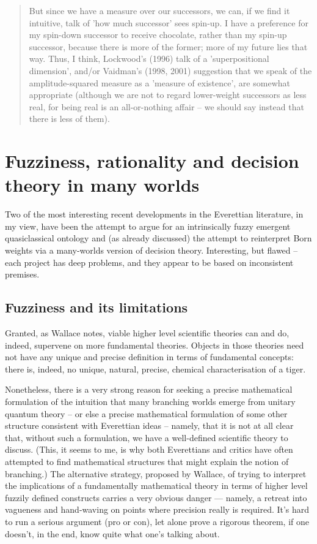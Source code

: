 \documentclass[aps,
pra,epsfig]{revtex4}
\begin{document}
\begin{quotation} 
But since we have
a measure over our successors, we can, if we find it intuitive, talk of 'how
much successor' sees spin-up. I have a preference for my spin-down successor
to receive chocolate, rather than my spin-up successor, because there is more of
the former; more of my future lies that way. Thus, I think, Lockwood's (1996)
talk of a 'superpositional dimension', and/or Vaidman's (1998, 2001) suggestion
that we speak of the amplitude-squared measure as a 'measure of existence', are
somewhat appropriate (although we are not to regard lower-weight successors
as less real, for being real is an 
all-or-nothing affair -- we should say instead
that there is less of them).
\end{quotation}

\section{Fuzziness, rationality and decision theory in many worlds}

Two of the most interesting recent developments in the Everettian
literature, in my view, have been the attempt to argue for
an intrinsically fuzzy emergent quasiclassical ontology\cite{wallacevolone}
and (as already discussed) the attempt to reinterpret
Born weights via a many-worlds version of 
decision theory\cite{wallacevoltwo}.   
Interesting, but flawed -- 
each project has deep problems, and they appear to be based on
inconsistent premises.   

\subsection{Fuzziness and its limitations}

Granted, as Wallace\cite{wallacevolone} notes, viable higher level scientific 
theories can and do, indeed, supervene on more fundamental theories. 
Objects in those theories need not have any unique and
precise definition in terms of fundamental concepts: 
there is, indeed, no unique, natural, precise, chemical characterisation 
of a tiger. 

Nonetheless, there is a very strong reason
for seeking\cite{akcritique} a precise mathematical
formulation of the intuition that many branching worlds emerge from 
unitary quantum theory -- or else a precise mathematical formulation
of some other structure consistent with Everettian ideas -- 
namely, that it is not at all clear that,
without such a formulation, we have a well-defined scientific theory
to discuss.   (This, it seems to me, is why both  
Everettians\cite{graham, deutschone} and
critics\cite{bellmw,almanyminds} have often attempted to find  
mathematical structures that might explain the notion of 
branching.)    The alternative 
strategy, proposed by Wallace\cite{wallacevolone}, of trying 
to interpret the implications of 
a fundamentally mathematical theory in terms of 
higher level fuzzily defined constructs carries a very obvious
danger --- namely, a retreat into vagueness and hand-waving on points where 
precision really is required.  
It's hard to run a serious argument (pro or con), let alone prove a 
rigorous theorem, if one doesn't, in the end, know quite what 
one's talking about.   
\end{document}
